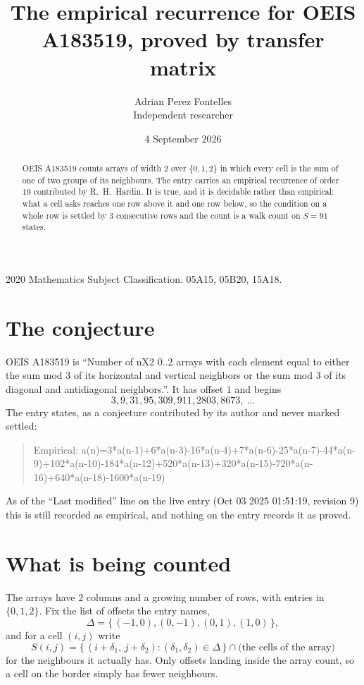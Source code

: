 \documentclass[11pt,a4paper]{article}
\title{The empirical recurrence for OEIS A183519, proved by transfer matrix}
\author{Adrian Perez Fontelles\\ \small Independent researcher}
\date{4 September 2026}
\theoremstyle{plain}
\theoremstyle{definition}
\begin{document}
\maketitle

\begin{abstract}
OEIS A183519 counts arrays of width $2$ over $\{0,1,2\}$ in which every cell is the sum of one of two groups of its neighbours. The entry carries an
empirical recurrence of order $19$ contributed by R.~H.~Hardin. It is true, and it is
decidable rather than empirical: what a cell asks reaches one row above
it and one row below, so the condition on a whole row is settled by
$3$ consecutive rows and the count is a walk count on $S=91$ states.
\end{abstract}

\noindent\small 2020 Mathematics Subject Classification. 05A15, 05B20, 15A18.\normalsize

\section{The conjecture}

OEIS A183519 is ``Number of nX2 0..2 arrays with each element equal to either the sum mod 3 of its horizontal and vertical neighbors or the sum mod 3 of its diagonal and antidiagonal neighbors.''. It has offset $1$ and begins
\[
3, 9, 31, 95, 309, 911, 2803, 8673,\ \dots
\]
The entry states, as a conjecture contributed by its author and never marked settled:
\begin{quote}
Empirical: a(n)=3*a(n-1)+6*a(n-3)-16*a(n-4)+7*a(n-6)-25*a(n-7)-44*a(n-9)+102*a(n-10)-184*a(n-12)+520*a(n-13)+320*a(n-15)-720*a(n-16)+640*a(n-18)-1600*a(n-19)
\end{quote}
As of the ``Last modified'' line on the live entry (Oct 03 2025 01:51:19, revision 9) this is still
recorded as empirical, and nothing on the entry records it as proved.

\section{What is being counted}

The arrays have $2$ columns and a growing number of rows, with entries in $\{0,1,2\}$. Fix the
list of offsets the entry names,
\[
\Delta=\{\,(-1,0), (0,-1), (0,1), (1,0)\,\},
\]
and for a cell $(i,j)$ write
\[
S(i,j)=\{\,(i+\delta_1,\,j+\delta_2) : (\delta_1,\delta_2)\in\Delta\,\}\cap
\text{(the cells of the array)}
\]
for the neighbours it actually has. Only offsets landing inside the array count, so a cell on
the border simply has fewer neighbours.
\end{document}
